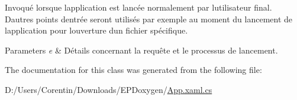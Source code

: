 Invoqué lorsque l\textquotesingle{}application est lancée normalement par l\textquotesingle{}utilisateur final. D\textquotesingle{}autres points d\textquotesingle{}entrée seront utilisés par exemple au moment du lancement de l\textquotesingle{}application pour l\textquotesingle{}ouverture d\textquotesingle{}un fichier spécifique. 


\begin{DoxyParams}{Parameters}
{\em e} & Détails concernant la requête et le processus de lancement.\\
\hline
\end{DoxyParams}


The documentation for this class was generated from the following file\+:\begin{DoxyCompactItemize}
\item 
D\+:/\+Users/\+Corentin/\+Downloads/\+E\+P\+Doxygen/\hyperlink{_app_8xaml_8cs}{App.\+xaml.\+cs}\end{DoxyCompactItemize}
